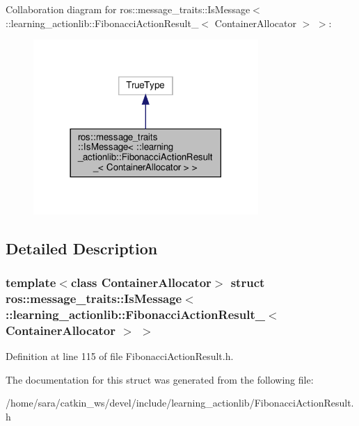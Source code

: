 Collaboration diagram for ros\+:\+:message\+\_\+traits\+:\+:Is\+Message$<$ \+:\+:learning\+\_\+actionlib\+:\+:Fibonacci\+Action\+Result\+\_\+$<$ Container\+Allocator $>$ $>$\+:
\nopagebreak
\begin{figure}[H]
\begin{center}
\leavevmode
\includegraphics[width=242pt]{structros_1_1message__traits_1_1IsMessage_3_01_1_1learning__actionlib_1_1FibonacciActionResult__313039d26caf2c43d6b5a1b2f38c6bd8}
\end{center}
\end{figure}


\subsection{Detailed Description}
\subsubsection*{template$<$class Container\+Allocator$>$\newline
struct ros\+::message\+\_\+traits\+::\+Is\+Message$<$ \+::learning\+\_\+actionlib\+::\+Fibonacci\+Action\+Result\+\_\+$<$ Container\+Allocator $>$ $>$}



Definition at line 115 of file Fibonacci\+Action\+Result.\+h.



The documentation for this struct was generated from the following file\+:\begin{DoxyCompactItemize}
\item 
/home/sara/catkin\+\_\+ws/devel/include/learning\+\_\+actionlib/Fibonacci\+Action\+Result.\+h\end{DoxyCompactItemize}

